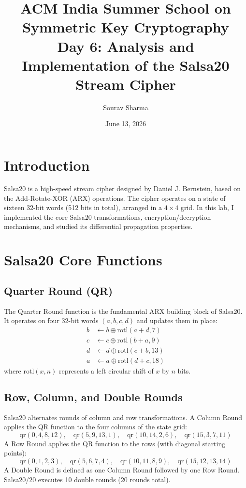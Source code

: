 \documentclass{article}
\title{ACM India Summer School on Symmetric Key Cryptography \\ Day 6: Analysis and Implementation of the Salsa20 Stream Cipher}
\author{Sourav Sharma}
\date{June 13, 2026}
\begin{document}
\maketitle

\section{Introduction}
Salsa20 is a high-speed stream cipher designed by Daniel J. Bernstein, based on the Add-Rotate-XOR (ARX) operations. The cipher operates on a state of sixteen 32-bit words (512 bits in total), arranged in a $4 \times 4$ grid. In this lab, I implemented the core Salsa20 transformations, encryption/decryption mechanisms, and studied its differential propagation properties.

\section{Salsa20 Core Functions}

\subsection{Quarter Round (QR)}
The Quarter Round function is the fundamental ARX building block of Salsa20. It operates on four 32-bit words $(a, b, c, d)$ and updates them in place:
\begin{align*}
    b &\gets b \oplus \text{rotl}(a + d, 7) \\
    c &\gets c \oplus \text{rotl}(b + a, 9) \\
    d &\gets d \oplus \text{rotl}(c + b, 13) \\
    a &\gets a \oplus \text{rotl}(d + c, 18)
\end{align*}
where $\text{rotl}(x, n)$ represents a left circular shift of $x$ by $n$ bits.

\subsection{Row, Column, and Double Rounds}
Salsa20 alternates rounds of column and row transformations. A Column Round applies the QR function to the four columns of the state grid:
\[ \text{qr}(0, 4, 8, 12), \quad \text{qr}(5, 9, 13, 1), \quad \text{qr}(10, 14, 2, 6), \quad \text{qr}(15, 3, 7, 11) \]
A Row Round applies the QR function to the rows (with diagonal starting points):
\[ \text{qr}(0, 1, 2, 3), \quad \text{qr}(5, 6, 7, 4), \quad \text{qr}(10, 11, 8, 9), \quad \text{qr}(15, 12, 13, 14) \]
A Double Round is defined as one Column Round followed by one Row Round. Salsa20/20 executes 10 double rounds (20 rounds total).
\end{document}
